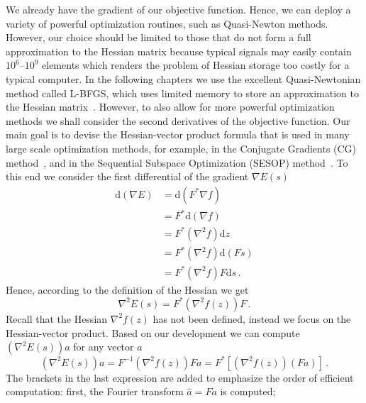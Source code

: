 We already have the gradient of our objective function. Hence, we can
deploy a variety of powerful optimization routines, such as
Quasi-Newton methods. However, our choice should be limited to those
that do not form a full approximation to the Hessian matrix because
typical signals may easily contain $10^{6}\text{--}10^{9}$ elements
which renders the problem of Hessian storage too costly for a
typical computer. In the following chapters we use the excellent
Quasi-Newtonian method called L-BFGS, which uses limited memory to
store an approximation to the Hessian matrix~\cite{liu89limited}.
However, to also allow for more powerful optimization methods we shall
consider the second derivatives of the objective function. Our main
goal is to devise the Hessian-vector product formula that is used in
many large scale optimization methods, for example, in the Conjugate
Gradients (CG) method~\cite{hestenes52methods}, and in the Sequential
Subspace Optimization (SESOP) method~.
To this end we consider the first differential of the gradient $\nabla
E(s)$
\begin{equation}
  \label{eq:math-12}
  \begin{split}
    \mathrm{d}(\nabla E)
    & = \mathrm{d} \left( F^{*}\nabla f \right)\\
    & = F^{*} \mathrm{d} \left( \nabla f \right)\\
    & = F^{*} \left( \nabla^{2}f \right) \mathrm{d} z \\
    & = F^{*} \left( \nabla^{2}f \right) \mathrm{d} (Fs) \\
    & = F^{*} \left( \nabla^{2}f\right) F \mathrm{d} s \,. 
  \end{split}
\end{equation}
Hence, according to the definition of the Hessian we get
\begin{equation}
  \label{eq:math-13}
  \nabla^{2}E(s) = F^{*}\left(\nabla^{2}f(z)\right)F \,.
\end{equation}
Recall that the Hessian $\nabla^{2}f(z)$ has not been defined,
instead we focus on the Hessian-vector product. Based on our
development we can compute $(\nabla^{2}E(s))a$ for any vector $a$
\begin{equation}
  \label{eq:80}
  (\nabla^{2}E(s))a = F^{-1}\left(\nabla^{2}f(z)\right)Fa =
  F^{*}\left[(\nabla^{2}f(z)) (Fa)\right]\,. 
\end{equation}
The brackets in the last expression are added to emphasize the order of
efficient computation: first, the Fourier transform $\hat{a}=Fa$ is computed;
